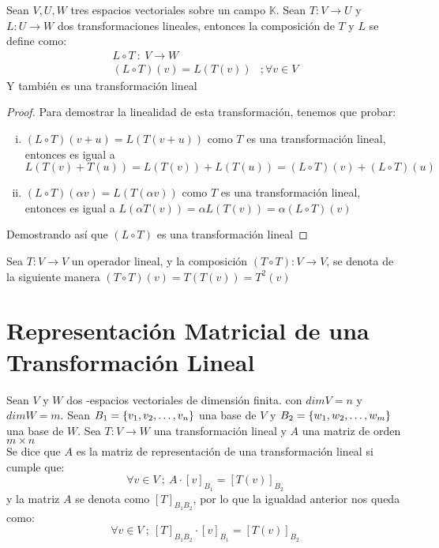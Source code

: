 \begin{theorem}
Sean $V,U,W$ tres espacios vectoriales sobre un campo $\mathbb{K}$. Sean $T: V \to U$ y $L: U \to W$ dos transformaciones lineales, entonces la composición de $T$ y $L$ se define como:
\begin{align*}
    L \circ T \ : \ V \to W & \\
    (L \circ T)(v) = L(T(v)) &; \forall v \in V
\end{align*}
Y también es una transformación lineal
\end{theorem}
\begin{proof}
Para demostrar la linealidad de esta transformación, tenemos que probar:
\begin{enumerate}[i.]
    \item $(L \circ T)(v + u) = L(T(v+u))$ como $T$ es una transformación lineal, entonces es igual a $L(T(v) + T(u)) = L(T(v)) + L(T(u)) = (L \circ T)(v) + (L \circ T)(u)$
    \item $(L \circ T)(\alpha v) = L(T(\alpha v))$ como $T$ es una transformación lineal, entonces es igual a $L(\alpha T(v)) = \alpha L(T(v)) = \alpha (L\circ T)(v)$
\end{enumerate}
Demostrando así que $(L \circ T)$ es una transformación lineal
\end{proof}

\begin{obs}
Sea $T: V \to V$ un operador lineal, y la composición $(T \circ T) : V \to V$, se denota de la siguiente manera $(T \circ T)(v) = T(T(v)) = 
T^2(v)$
\end{obs}
\section{Representación Matricial de una Transformación Lineal}

\begin{dfn}
Sean $V$ y $W$ dos \dobleK-espacios vectoriales de dimensión finita.
con $dimV = n$ y $dimW = m$. Sean $B_1 =  \lbrace v_1, v_2, \ldots, v_n \rbrace$ una base de $V$ y $B_2 =  \lbrace w_1, w_2, \ldots, w_m \rbrace$ una base de $W$. Sea $T : V \to W$ una
transformación lineal y $A$ una matriz de orden $m\times n$\\
Se dice que $A$ es la matriz de representación de una transformación lineal si cumple que:
$$\forall v \in V \ ; \ A \cdot [v]_{B_1} = [T(v)]_{B_2}$$
y la matriz $A$ se denota como $[T]_{B_1 B_2}$, por lo que la igualdad anterior nos queda como:
$$\forall v \in V \ ; \ [T]_{B_1 B_2} \cdot [v]_{B_1} = [T(v)]_{B_2}$$
\end{dfn}

